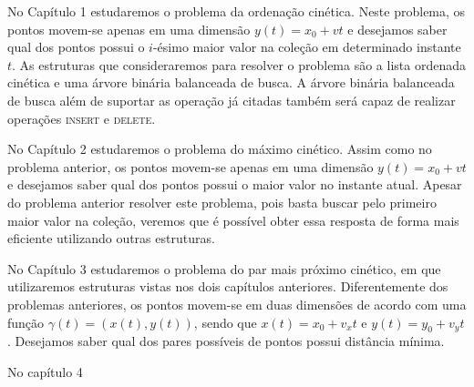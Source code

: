No Capítulo 1 estudaremos o problema da ordenação cinética.
Neste problema, os pontos movem-se apenas em uma dimensão $y(t) = x_0 + vt$ e
desejamos saber qual dos pontos possui o $i$-ésimo maior valor na coleção em
determinado instante $t$.
As estruturas que consideraremos para resolver o problema são a lista
ordenada cinética e uma árvore binária balanceada de busca.
A árvore binária balanceada de busca além de suportar as operação já citadas
também será capaz de realizar operações \textsc{insert} e \textsc{delete}.

No Capítulo 2 estudaremos o problema do máximo cinético.
Assim como no problema anterior, os pontos movem-se apenas em uma
dimensão $y(t) = x_0 + vt$ e desejamos saber qual dos pontos possui o maior valor
no instante atual.
Apesar do problema anterior resolver este problema, pois basta buscar pelo primeiro
maior valor na coleção, veremos que é possível obter essa resposta de forma mais
eficiente utilizando outras estruturas.

No Capítulo 3 estudaremos o problema do par mais próximo cinético, em que
utilizaremos estruturas vistas nos dois capítulos anteriores.
Diferentemente dos problemas anteriores, os pontos movem-se em duas dimensões
de acordo com uma função $\gamma(t) = (x(t), y(t))$, sendo que $x(t) = x_0 + v_x t$ e
$y(t) = y_0 + v_y t$.
Desejamos saber qual dos pares possíveis de pontos possui distância mínima.

No capítulo 4

